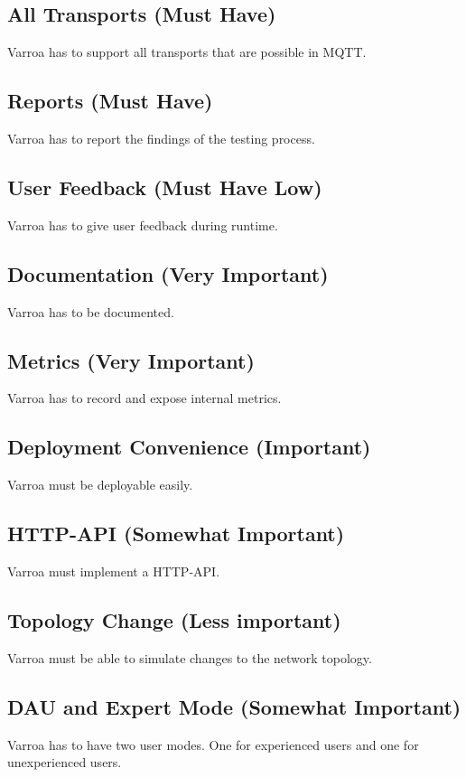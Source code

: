 \subsection{All Transports (Must Have)}
Varroa has to support all transports that are possible in MQTT.

\subsection{Reports (Must Have)}
Varroa has to report the findings of the testing process.

\subsection{User Feedback (Must Have Low)}
Varroa has to give user feedback during runtime.

\subsection{Documentation (Very Important)}
Varroa has to be documented. 

\subsection{Metrics (Very Important)}
Varroa has to record and expose internal metrics.

\subsection{Deployment Convenience (Important)}
Varroa must be deployable easily.

\subsection{HTTP-API (Somewhat Important)}
Varroa must implement a HTTP-API.

\subsection{Topology Change (Less important)}
Varroa must be able to simulate changes to the network topology.

\subsection{DAU and Expert Mode (Somewhat Important)}
Varroa has to have two user modes.
One for experienced users and one for unexperienced users.

